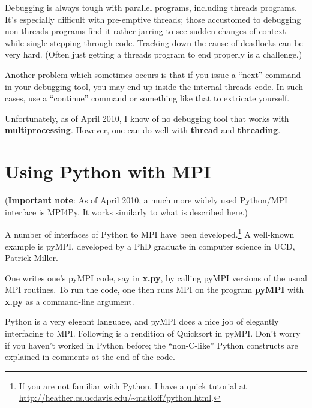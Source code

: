 Debugging is always tough with parallel programs, including threads
programs.  It's especially difficult with pre-emptive threads; those
accustomed to debugging non-threads programs find it rather jarring to
see sudden changes of context while single-stepping through code.
Tracking down the cause of deadlocks can be very hard.  (Often just
getting a threads program to end properly is a challenge.)

Another problem which sometimes occurs is that if you issue a ``next''
command in your debugging tool, you may end up inside the internal
threads code.  In such cases, use a ``continue'' command or something
like that to extricate yourself.

Unfortunately, as of April 2010, I know of no debugging tool that works
with {\bf multiprocessing}.  However, one can do well with {\bf thread}
and {\bf threading}.

\section{Using Python with MPI}

({\bf Important note}:  As of April 2010, a much more widely used
Python/MPI interface is MPI4Py.  It works similarly to what is described
here.)

A number of interfaces of Python to MPI have been developed.\footnote{If
you are not familiar with Python, I have a quick tutorial at
\url{http://heather.cs.ucdavis.edu/~matloff/python.html}.}  A well-known
example is pyMPI, developed by a PhD graduate in computer science in
UCD, Patrick Miller.  

One writes one's pyMPI code, say in {\bf x.py}, by calling pyMPI
versions of the usual MPI routines.  To run the code, one then runs MPI
on the program {\bf pyMPI} with {\bf x.py} as a command-line argument.

Python is a very elegant language, and pyMPI does a nice job of
elegantly interfacing to MPI.  Following is a rendition of Quicksort in
pyMPI.  Don't worry if you haven't worked in Python before; the
``non-C-like'' Python constructs are explained in comments at the end
of the code. 

